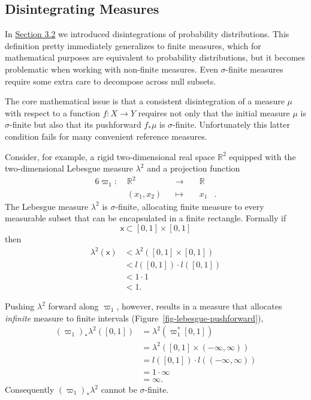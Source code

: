 \documentclass[
  letterpaper,
  DIV=11,
  numbers=noendperiod]{scrartcl}
\begin{document}
\subsection{Disintegrating Measures}\label{disintegrating-measures}

In \hyperref[sec:general-conditional]{Section 3.2} we introduced
disintegrations of probability distributions. This definition pretty
immediately generalizes to finite measures, which for mathematical
purposes are equivalent to probability distributions, but it becomes
problematic when working with non-finite measures. Even
\(\sigma\)-finite measures require some extra care to decompose across
null subsets.

The core mathematical issue is that a consistent disintegration of a
measure \(\mu\) with respect to a function \(f : X \rightarrow Y\)
requires not only that the initial measure \(\mu\) is \(\sigma\)-finite
but also that its pushforward \(f_{*} \mu\) is \(\sigma\)-finite.
Unfortunately this latter condition fails for many convenient reference
measures.

Consider, for example, a rigid two-dimensional real space
\(\mathbb{R}^{2}\) equipped with the two-dimensional Lebesgue measure
\(\lambda^{2}\) and a projection function \begin{alignat*}{6}
\varpi_{1} :\; &\mathbb{R}^{2}& &\rightarrow& \; &\mathbb{R}&
\\
&(x_{1}, x_{2})& &\mapsto& &x_{1}&.
\end{alignat*} The Lebesgue measure \(\lambda^{2}\) is
\(\sigma\)-finite, allocating finite measure to every measurable subset
that can be encapsulated in a finite rectangle. Formally if \[
\mathsf{x} \subset [0, 1] \times [0, 1]
\] then \begin{align*}
\lambda^{2}(\mathsf{x})
&<
\lambda^{2}( [0, 1] \times [0, 1] )
\\
&<
l([0, 1]) \cdot l([0, 1])
\\
&<
1 \cdot 1
\\
&<
1.
\end{align*}

Pushing \(\lambda^{2}\) forward along \(\varpi_{1}\), however, results
in a measure that allocates \emph{infinite} measure to finite intervals
(Figure~\ref{fig-lebesgue-pushforward}), \begin{align*}
(\varpi_{1})_{*} \lambda^{2} ( [0, 1] )
&=
\lambda^{2}( \varpi_{1}^{*} [0, 1])
\\
&= \lambda^{2}( [0, 1] \times (-\infty, \infty) )
\\
&= l([0, 1]) \cdot l( (-\infty, \infty) )
\\
&= 1 \cdot \infty
\\
&= \infty.
\end{align*} Consequently \((\varpi_{1})_{*} \lambda^{2}\) cannot be
\(\sigma\)-finite.
\end{document}
